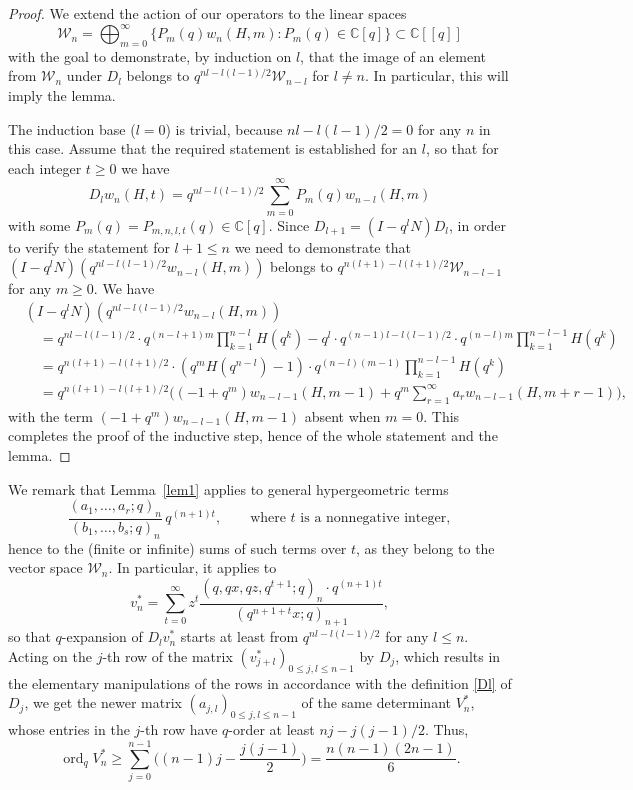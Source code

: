 \documentclass[12pt,reqno]{amsart}
\theoremstyle{remark}
\newcommand{\ord}{\operatorname{ord}}
\newcommand\cW{\mathcal{W}}
\begin{document}
\begin{proof}
We extend the action of our operators to the linear spaces
$$
\cW_n=\bigoplus_{m=0}^\infty\{P_m(q)w_n(H,m):P_m(q)\in\mathbb C[q]\}\subset\mathbb C[[q]]
$$
with the goal to demonstrate, by induction on $l$, that the image of an element from $\cW_n$ under $D_l$ belongs to $q^{nl-l(l-1)/2}\cW_{n-l}$
for $l\ne n$. In particular, this will imply the lemma.

The induction base ($l=0$) is trivial, because $nl-l(l-1)/2=0$ for any $n$ in this case.
Assume that the required statement is established for an $l$,
so that for each integer $t\ge0$ we have
$$
D_lw_n(H,t)=q^{nl-l(l-1)/2}\sum_{m=0}^\infty P_m(q)w_{n-l}(H,m)
$$
with some $P_m(q)=P_{m,n,l,t}(q)\in\mathbb C[q]$. Since $D_{l+1}=(I-q^lN)D_l$, in order to verify the statement for $l+1\le n$
we need to demonstrate that $(I-q^lN)(q^{nl-l(l-1)/2}w_{n-l}(H,m))$ belongs to $q^{n(l+1)-l(l+1)/2}\cW_{n-l-1}$ for any $m\ge0$.
We have
\begin{align*}
&
(I-q^lN)(q^{nl-l(l-1)/2}w_{n-l}(H,m))
\\ &\quad
=q^{nl-l(l-1)/2}\cdot q^{(n-l+1)m}\prod_{k=1}^{n-l}H(q^k)
-q^l\cdot q^{(n-1)l-l(l-1)/2}\cdot q^{(n-l)m}\prod_{k=1}^{n-l-1}H(q^k)
\\ &\quad
=q^{n(l+1)-l(l+1)/2}\cdot(q^mH(q^{n-l})-1)\cdot q^{(n-l)(m-1)}\prod_{k=1}^{n-l-1}H(q^k)
\\ &\quad
=q^{n(l+1)-l(l+1)/2}\biggl((-1+q^m)w_{n-l-1}(H,m-1)+q^m\sum_{r=1}^\infty a_rw_{n-l-1}(H,m+r-1)\biggr),
\end{align*}
with the term $(-1+q^m)w_{n-l-1}(H,m-1)$ absent when $m=0$.
This completes the proof of the inductive step, hence of the whole statement and the lemma.
\end{proof}

We remark that Lemma~\ref{lem1} applies to general hypergeometric terms
$$
\frac{(a_1,\dots,a_r;q)_n}{(b_1,\dots,b_s;q)_n}\,q^{(n+1)t}, \qquad\text{where $t$ is a nonnegative integer},
$$
hence to the (finite or infinite) sums of such terms over $t$, as they belong to the vector space $\cW_n$.
In particular, it applies to
$$
v_n^*=\sum_{t=0}^\infty z^t\frac{(q,qx,qz,q^{t+1};q)_n\cdot q^{(n+1)t}}{(q^{n+1+t}x;q)_{n+1}},
$$
so that $q$-expansion of $D_lv_n^*$ starts at least from $q^{nl-l(l-1)/2}$ for any $l\le n$.
Acting on the $j$-th row of the matrix $(v_{j+l}^*)_{0\le j,l\le n-1}$ by $D_j$, which results in the elementary
manipulations of the rows in accordance with the definition \eqref{Dl} of $D_j$, we get the newer matrix $(a_{j,l})_{0\le j,l\le n-1}$ of the same
determinant $V_n^*$, whose entries in the $j$-th row have $q$-order at least $nj-j(j-1)/2$. Thus,
$$
\ord_qV_n^*\ge\sum_{j=0}^{n-1}\biggl((n-1)j-\frac{j(j-1)}2\biggr)=\frac{n(n-1)(2n-1)}6.
$$
\end{document}
